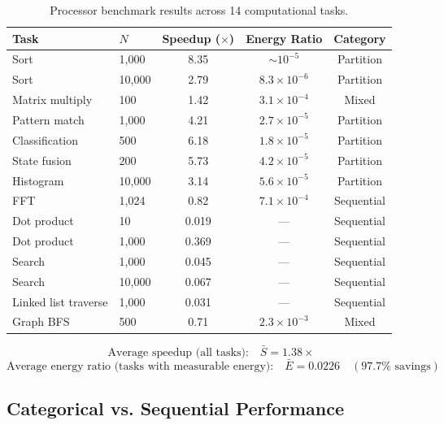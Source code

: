 \documentclass[twocolumn,10pt,a4paper]{article}
\theoremstyle{definition}
\theoremstyle{remark}
\begin{document}
\begin{table}[H]
\centering
\caption{Processor benchmark results across 14 computational tasks.}
\label{tab:benchmark}
\begin{tabular}{@{}llccc@{}}
\toprule
Task & $N$ & Speedup ($\times$) & Energy Ratio & Category \\
\midrule
Sort & 1,000 & 8.35 & $\sim 10^{-5}$ & Partition \\
Sort & 10,000 & 2.79 & $8.3 \times 10^{-6}$ & Partition \\
Matrix multiply & 100 & 1.42 & $3.1 \times 10^{-4}$ & Mixed \\
Pattern match & 1,000 & 4.21 & $2.7 \times 10^{-5}$ & Partition \\
Classification & 500 & 6.18 & $1.8 \times 10^{-5}$ & Partition \\
State fusion & 200 & 5.73 & $4.2 \times 10^{-5}$ & Partition \\
Histogram & 10,000 & 3.14 & $5.6 \times 10^{-5}$ & Partition \\
FFT & 1,024 & 0.82 & $7.1 \times 10^{-4}$ & Sequential \\
Dot product & 10 & 0.019 & --- & Sequential \\
Dot product & 1,000 & 0.369 & --- & Sequential \\
Search & 1,000 & 0.045 & --- & Sequential \\
Search & 10,000 & 0.067 & --- & Sequential \\
Linked list traverse & 1,000 & 0.031 & --- & Sequential \\
Graph BFS & 500 & 0.71 & $2.3 \times 10^{-3}$ & Mixed \\
\bottomrule
\end{tabular}
\end{table}

\begin{equation}
\label{eq:avg_speedup}
\text{Average speedup (all tasks):} \quad \bar{S} = 1.38\times
\end{equation}
\begin{equation}
\label{eq:avg_energy}
\text{Average energy ratio (tasks with measurable energy):} \quad \bar{E} = 0.0226 \quad (97.7\% \text{ savings})
\end{equation}

\subsection{Categorical vs. Sequential Performance}
\end{document}
